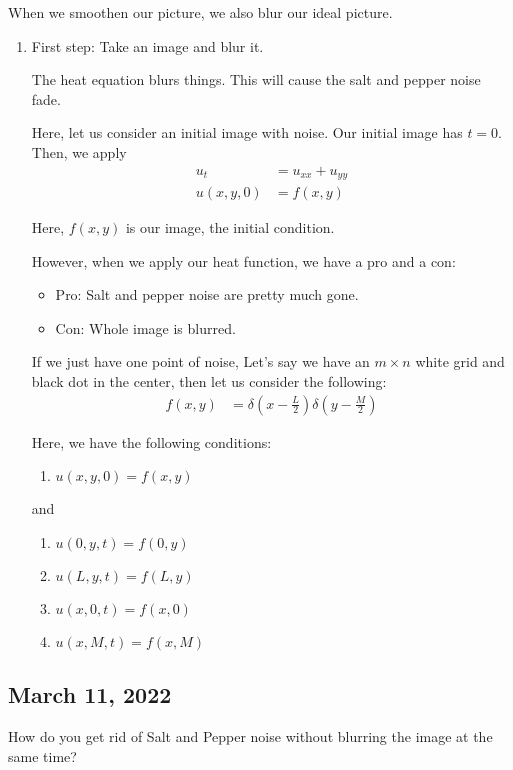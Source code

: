 When we smoothen our picture, we also blur our ideal picture.

\begin{enumerate}
  \item First step: Take an image and blur it.

  The heat equation blurs things. This will cause the salt and pepper noise fade.

  Here, let us consider an initial image with noise. Our initial image has $t = 0$. Then, we apply
  \begin{align}
    u_t & = u_{xx} + u_{yy}\\
    u(x, y, 0) & = f(x, y)
  \end{align}

  Here, $f(x, y)$ is our image, the initial condition.

  However, when we apply our heat function, we have a pro and a con:
  \begin{itemize}
    \item Pro: Salt and pepper noise are pretty much gone.
    \item Con: Whole image is blurred.
  \end{itemize}

  If we just have one point of noise, Let's say we have an $m \times n$ white grid and black dot in the center,
  then let us consider the following:
  \begin{align}
    f(x, y) & = \delta\left(x - \frac{L}{2}\right) \delta\left(y - \frac{M}{2}\right)
  \end{align}

  Here, we have the following conditions:
  \begin{enumerate}
    \item $u(x, y, 0) = f(x, y)$
  \end{enumerate}

  and
  \begin{enumerate}
    \item $u(0, y, t) = f(0, y)$
    \item $u(L, y, t) = f(L, y)$
    \item $u(x, 0, t) = f(x, 0)$
    \item $u(x, M, t) = f(x, M)$
  \end{enumerate}
\end{enumerate}

\subsection*{March 11, 2022}
How do you get rid of Salt and Pepper noise without blurring the image at the same time?

